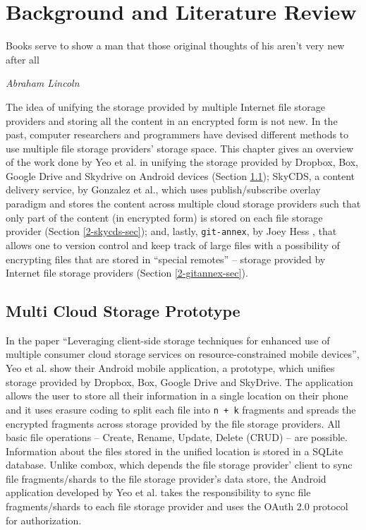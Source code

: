 \chapter{Background and Literature Review}

\epigraph{Books serve to show a man that those original thoughts of
  his aren't very new after all}{\textit{Abraham Lincoln}}

The idea of unifying the storage provided by multiple Internet file
storage providers and storing all the content in an encrypted form is
not new. In the past, computer researchers and programmers have
devised different methods to use multiple file storage providers'
storage space. This chapter gives an overview of the work done by Yeo
et al. in unifying the storage provided by Dropbox, Box, Google Drive
and Skydrive on Android devices \cite{yeo}(Section \ref{2-yeo-sec});
SkyCDS, a content delivery service, by Gonzalez et al., which uses
publish/subscribe overlay paradigm and stores the content across
multiple cloud storage providers such that only part of the content
(in encrypted form) is stored on each file storage provider
\cite{skycds}(Section \ref{2-skycds-sec}); and, lastly,
\verb+git-annex+, by Joey Hess \cite{person:joeyh}, that allows one to
version control and keep track of large files with a possibility of
encrypting files that are stored in ``special remotes'' -- storage
provided by Internet file storage providers (Section
\ref{2-gitannex-sec}).

\section{Multi Cloud Storage Prototype}\label{2-yeo-sec}

In the paper ``Leveraging client-side storage techniques for enhanced
use of multiple consumer cloud storage services on
resource-constrained mobile devices'', Yeo et al. show their Android
mobile application, a prototype, which unifies storage provided by
Dropbox, Box, Google Drive and SkyDrive. The application allows the
user to store all their information in a single location on their
phone and it uses erasure coding \cite{weatherspoon} to split each
file into \verb`n + k` fragments and spreads the encrypted fragments
across storage provided by the file storage providers. All basic file
operations -- Create, Rename, Update, Delete (CRUD) -- are
possible. Information about the files stored in the unified location
is stored in a SQLite database. Unlike combox, which depends the file
storage provider' client to sync file fragments/shards to the file
storage provider's data store, the Android application developed by
Yeo et al. takes the responsibility to sync file fragments/shards to
each file storage provider and uses the OAuth 2.0
\cite{protocol:oauth2} protocol for authorization.

